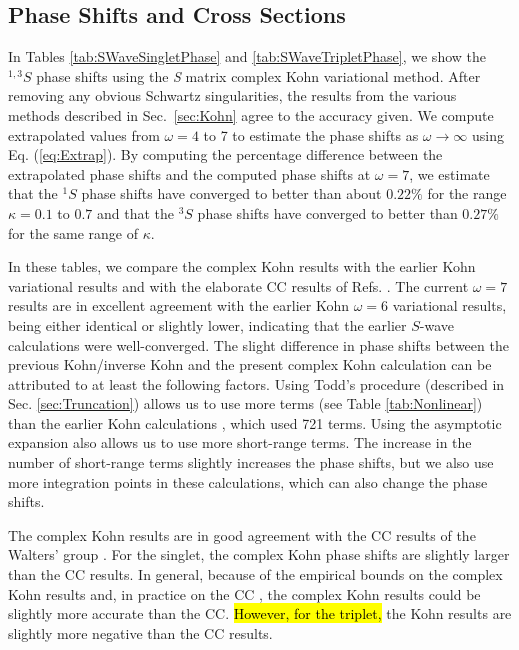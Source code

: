\documentclass[preprint,showpacs,showkeys,preprintnumbers,amsmath,amssymb,longbibliography,pra,aps]{revtex4-1}
\newcommand{\todoi}{\todo[inline]}
\begin{document}
{\subsection{Phase Shifts and Cross Sections}
\label{sec:PhaseCross}

In Tables \ref{tab:SWaveSingletPhase} and \ref{tab:SWaveTripletPhase}, we 
show the $^{1,3}S$ phase shifts using the \emph{S} matrix complex Kohn 
variational method. After removing any obvious Schwartz singularities, the
results from the various methods described in Sec.~\ref{sec:Kohn} agree
to the accuracy given. We compute extrapolated values from $\omega = 4$ to 7
to estimate the phase shifts as $\omega \rightarrow \infty$ using Eq.
(\ref{eq:Extrap}). By computing the percentage difference between the
extrapolated phase shifts and the computed phase shifts at $\omega=7$, we
estimate that the $^1S$ phase shifts have converged to better than about
$0.22\%$ for the range $\kappa=0.1$ to $0.7$ and that the $^3S$ phase shifts
have converged to better than $0.27\%$ for the same range of $\kappa$.

In these tables, we compare the complex Kohn results with the earlier Kohn variational 
results \cite{VanReeth2003,VanReeth2004} and with the elaborate CC results of 
Refs. \cite{Blackwood2002,Walters2004}. The current $\omega = 7$ results are 
in excellent agreement with the earlier Kohn $\omega = 6$ variational 
results, being either identical or slightly lower, indicating that the 
earlier $S$-wave calculations were well-converged. The slight difference in 
phase shifts between the previous Kohn/inverse Kohn and the present complex Kohn calculation can be attributed 
to at least the following factors. Using Todd's procedure (described in Sec. \ref{sec:Truncation}) 
allows us to use more terms (see Table \ref{tab:Nonlinear}) than the earlier 
Kohn calculations \cite{VanReeth2003,VanReeth2004}, which used 721 terms. Using
the asymptotic expansion also allows us to use more short-range terms.
The increase in the number of short-range terms
slightly increases the phase shifts, but we also use more integration 
points in these calculations, which can also change the phase shifts. 

The complex Kohn results are in good agreement with the CC results of the 
Walters' group \cite{Blackwood2002,Walters2004}. For the singlet, the complex 
Kohn phase shifts are slightly larger than the CC results.
In general, because of the 
empirical bounds on the complex Kohn results and,
in practice on the CC \cite{Blackwood2002}, the complex Kohn results could be slightly 
more accurate than the CC. \hl{However, for the triplet,}
the Kohn results are slightly more negative than the CC results.

}
\end{document}
